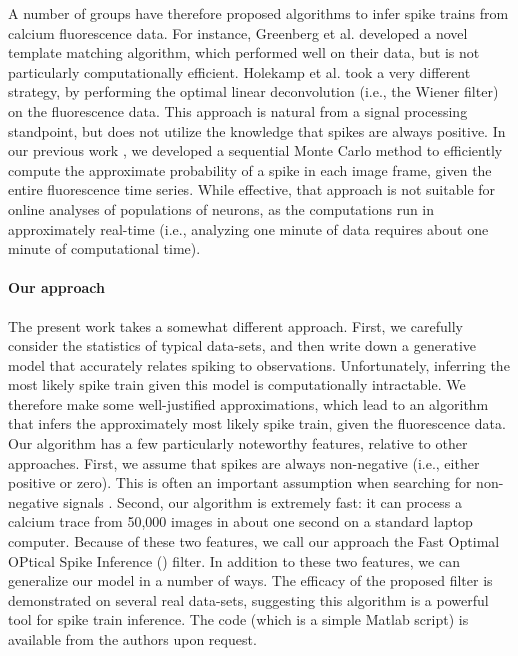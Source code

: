 A number of groups have therefore proposed algorithms to infer spike trains from calcium fluorescence data.  For instance, Greenberg et al. \cite{GreenbergKerr08} developed a novel template matching algorithm, which performed well on their data, but is not particularly computationally efficient.  Holekamp et al. \cite{HolekampHoly08} took a very different strategy, by performing the optimal linear deconvolution (i.e., the Wiener filter) on the fluorescence data.  This approach is natural from a signal processing standpoint, but does not utilize the knowledge that spikes are always positive.  In our previous work \cite{VogelsteinPaninski09}, we developed a sequential Monte Carlo method to efficiently compute the approximate probability of a spike in each image frame, given the entire fluorescence time series.   While effective, that approach is not suitable for online analyses of populations of neurons, as the computations run in approximately real-time (i.e., analyzing one minute of data requires about one minute of computational time).

\paragraph{Our approach}

The present work takes a somewhat different approach.  First, we carefully consider the statistics of typical data-sets, and then write down a generative model that accurately relates spiking to observations. Unfortunately, inferring the most likely spike train given this model is computationally intractable.  We therefore make some well-justified approximations, which lead to an algorithm that infers the approximately most likely spike train, given the fluorescence data.  Our algorithm has a few particularly noteworthy features, relative to other approaches.  First, we assume that spikes are always non-negative (i.e., either positive or zero).  This is often an important assumption when searching for non-negative signals \cite{LeeSeung99, LeeSeung01, HuysPaninski06}.  Second, our algorithm is extremely fast: it can process a calcium trace from 50,000 images in about one second on a standard laptop computer.  Because of these two features, we call our approach the Fast Optimal OPtical Spike Inference (\foopsi) filter. In addition to these two features, we can generalize our model in a number of ways. The efficacy of the proposed filter is demonstrated on several real data-sets, suggesting this algorithm is a powerful tool for spike train inference.  The code (which is a simple Matlab script) is available from the authors upon request.  %


